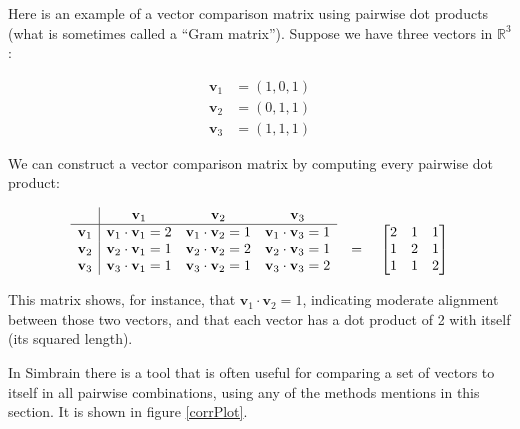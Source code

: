 Here is an example of a vector comparison matrix using pairwise dot products (what is sometimes called a ``Gram matrix''). Suppose we have three vectors in \( \mathbb{R}^3 \):

\begin{align*}
\mathbf{v}_1 &= (1,0,1) \\
\mathbf{v}_2 &= (0,1,1) \\
\mathbf{v}_3 &= (1,1,1)
\end{align*}

We can construct a vector comparison matrix by computing every pairwise dot product:

\[
\begin{array}{c|ccc}
 & \mathbf{v}_1 & \mathbf{v}_2 & \mathbf{v}_3 \\
\hline
\mathbf{v}_1 & \mathbf{v}_1 \cdot \mathbf{v}_1 = 2 & \mathbf{v}_1 \cdot \mathbf{v}_2 = 1 & \mathbf{v}_1 \cdot \mathbf{v}_3 = 1 \\
\mathbf{v}_2 & \mathbf{v}_2 \cdot \mathbf{v}_1 = 1 & \mathbf{v}_2 \cdot \mathbf{v}_2 = 2 & \mathbf{v}_2 \cdot \mathbf{v}_3 = 1 \\
\mathbf{v}_3 & \mathbf{v}_3 \cdot \mathbf{v}_1 = 1 & \mathbf{v}_3 \cdot \mathbf{v}_2 = 1 & \mathbf{v}_3 \cdot \mathbf{v}_3 = 2 \\
\end{array}
\raisebox{-0.3\height}{%
\quad = \quad
$\begin{bmatrix}
2 & 1 & 1 \\
1 & 2 & 1 \\
1 & 1 & 2 \\
\end{bmatrix}$}
\]

This matrix shows, for instance, that \( \mathbf{v}_1 \cdot \mathbf{v}_2 = 1 \), indicating 
moderate alignment between those two vectors, and that each vector has a dot product of 2 
with itself (its squared length).

In Simbrain there is a tool that is often useful for comparing a set of vectors to itself in all pairwise combinations, using any of the  methods mentions in this section. It is shown in figure \ref{corrPlot}.

